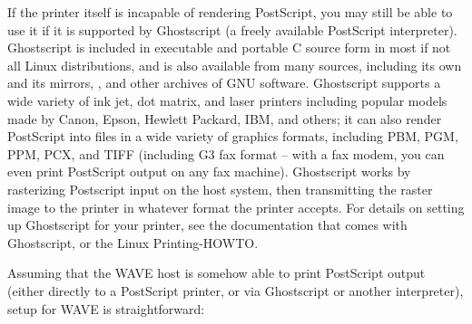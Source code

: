 \documentclass[twoside]{book}
\newcommand{\WAVE}{{\sf WAVE}\xspace}
\begin{document}
If the printer itself is incapable of rendering PostScript, you may
still be able to use it if it is supported by Ghostscript (a freely
available PostScript interpreter).  Ghostscript is included in
executable and portable C source form in most if not all Linux
distributions, and is also available from many
sources, including its own
 and its
mirrors, ,
and other archives of GNU software.  Ghostscript supports a wide
variety of ink jet, dot matrix,
and laser printers including popular models made by Canon, Epson,
Hewlett Packard, IBM, and others; it can also render PostScript into
files in a wide variety of graphics formats, including PBM, PGM, PPM,
PCX, and TIFF (including G3 fax format -- with a fax modem, you can
even print PostScript output on any fax machine).  Ghostscript works
by rasterizing Postscript input on the host system, then transmitting
the raster image to the printer in whatever format the printer
accepts.  For details on setting up Ghostscript for your printer, see
the documentation that comes with Ghostscript, or the Linux
Printing-HOWTO.

Assuming that the \WAVE{} host is somehow able to print PostScript
output (either directly to a PostScript printer, or via Ghostscript or
another interpreter), setup for \WAVE{} is straightforward:
\end{document}
